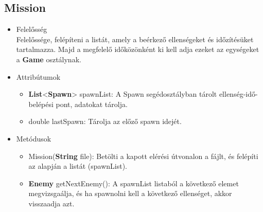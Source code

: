 \subsection{Mission}
\begin{itemize}
\item Felelősség\\
Felelőssége, felépíteni a listát, amely a beérkező ellenségeket és időzítésüket tartalmazza. Majd a megfelelő időközönként ki kell adja ezeket az egységeket a \textbf{Game} osztálynak.
\item Attribútumok
	\begin{itemize}
		\item \textbf{List}<\textbf{Spawn}> spawnList: A Spawn segédosztályban tárolt ellenség-idő-belépési pont, adatokat tárolja.
		\item double lastSpawn: Tárolja az előző spawn idejét.
	\end{itemize}
\item Metódusok
	\begin{itemize}
		\item Mission(\textbf{String} file): Betölti a kapott elérési útvonalon a fájlt, és felépíti az alapján a listát (spawnList).
		\item \textbf{Enemy} getNextEnemy(): A spawnList listaból a következő elemet megvizsgaálja, és ha spawnolni kell a következő ellenséget, akkor visszaadja azt.
	\end{itemize}
\end{itemize}


